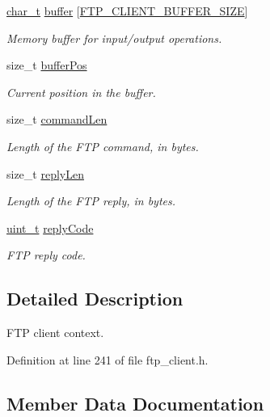 \begin{DoxyCompactItemize}
\hyperlink{compiler__port_8h_a40bb5262bf908c328fbcfbe5d29d0201}{char\+\_\+t} \hyperlink{struct__FtpClientContext_a65ac817f04c513d4a920ae1967b70cda}{buffer} \mbox{[}\hyperlink{ftp__client_8h_a686faf7a79b419726b351d164f0f14c4}{F\+T\+P\+\_\+\+C\+L\+I\+E\+N\+T\+\_\+\+B\+U\+F\+F\+E\+R\+\_\+\+S\+I\+ZE}\mbox{]}
\begin{DoxyCompactList}\small\item\em Memory buffer for input/output operations. \end{DoxyCompactList}\item 
size\+\_\+t \hyperlink{struct__FtpClientContext_a1b614021b5fd378133771d888909e6ec}{buffer\+Pos}
\begin{DoxyCompactList}\small\item\em Current position in the buffer. \end{DoxyCompactList}\item 
size\+\_\+t \hyperlink{struct__FtpClientContext_a99572d7e4b319a6e6176b160584ea0d9}{command\+Len}
\begin{DoxyCompactList}\small\item\em Length of the F\+TP command, in bytes. \end{DoxyCompactList}\item 
size\+\_\+t \hyperlink{struct__FtpClientContext_adcbb49bdeeeb6e961c6ea4d346e4e22b}{reply\+Len}
\begin{DoxyCompactList}\small\item\em Length of the F\+TP reply, in bytes. \end{DoxyCompactList}\item 
\hyperlink{compiler__port_8h_a12a1e9b3ce141648783a82445d02b58d}{uint\+\_\+t} \hyperlink{struct__FtpClientContext_a1aa9b36e0cad78e6d1ffbd5a8df433e8}{reply\+Code}
\begin{DoxyCompactList}\small\item\em F\+TP reply code. \end{DoxyCompactList}\end{DoxyCompactItemize}


\subsection{Detailed Description}
F\+TP client context. 

Definition at line 241 of file ftp\+\_\+client.\+h.



\subsection{Member Data Documentation}
\mbox{\label{struct__FtpClientContext_a65ac817f04c513d4a920ae1967b70cda}} 

